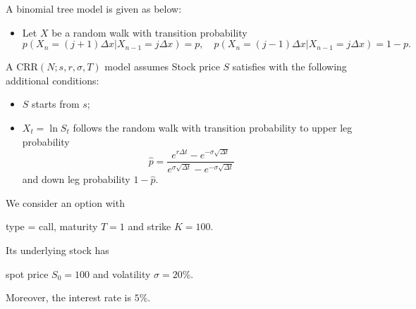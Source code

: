\documentclass{article}
\begin{document}
\begin{center}
\end{center}


A binomial tree model is given as below:
\begin{itemize}
 \item Let $X$ be a random walk with transition probability
 $$p(X_{n} = (j+1)\Delta x | X_{n-1} = j \Delta x) = p, 
 \quad 
 p(X_{n} = (j-1)\Delta x | X_{n-1} = j \Delta x) = 1-p.
 $$
 \end{itemize}

A CRR$(N; s, r, \sigma, T)$ model assumes Stock price $S$ satisfies
with the following additional conditions:
\begin{itemize}
 \item $S$ starts from $s$;
 \item $X_{t} = \ln S_{t}$ follows the random walk with transition probability 
to upper leg probability 
$$\hat p = \frac{e^{r\Delta t} - e^{-\sigma \sqrt{\Delta t}}}
{e^{\sigma \sqrt{\Delta t}} - e^{-\sigma \sqrt{\Delta t}}}$$
and down leg probability $1- \hat p$.
\end{itemize}







We consider an option with 
\begin{center}
 type = call, maturity $T = 1$ and strike $K = 100$.
\end{center}
Its underlying stock has 
\begin{center}
 spot price $S_{0} = 100$ and volatility $\sigma = 20\%$.
\end{center}
Moreover, the interest rate is $5\%$.
\end{document}
